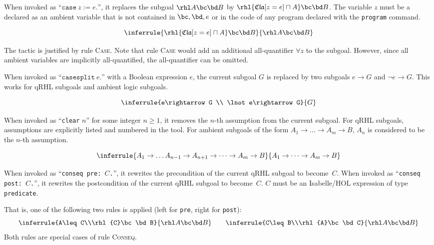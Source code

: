 \documentclass{article}
\renewcommand\ruleref[1]{rule \hbox{\textsc{#1}}}
\begin{document}

When invoked as ``$\mathtt{case}\ z := e\mathtt{.}$'',
it replaces the subgoal $\rhl A\bc\bd B$
by $\rhl{\mathfrak{Cla}[z=e]\sqcap A}\bc\bd B$.
The variable $z$
must be a declared as an ambient variable that is not contained in
$\bc,\bd,e$
or in the code of any program declared with the \texttt{program} command.

\[
\inferrule
{\rhl{\mathfrak{Cla}[z=e]\sqcap A}\bc\bd B}
{\rhl A\bc\bd B}
\]

The tactic is justified by \ruleref{Case}. Note that \ruleref{Case}
would add an additional all-quantifier $\forall z$
to the subgoal. However, since all ambient variables are implicitly
all-quantified, the all-quantifier can be omitted.



When invoked as ``$\mathtt{casesplit}\ e\mathtt{.}$''
with a Boolean expression $e$,
the current subgoal $G$
is replaced by two subgoals $e\rightarrow G$
and $\lnot e\rightarrow G$.
This works for qRHL subgoals and ambient logic subgoals.

\[
  \inferrule
  {e\rightarrow G
    \\
    \lnot e\rightarrow G}
  {G}
\]


When invoked as ``\texttt{clear} $n$''
for some integer $n\geq 1$,
it removes the $n$-th
assumption from the current subgoal. For qRHL subgoals, assumptions
are explicitly listed and numbered in the tool. For ambient subgoals of the form
$A_1\to \dots \to A_m\to B$,
$A_n$ is considered to be the $n$-th assumption.

\[
  \inferrule
  {A_1\to \dots A_{n-1}\to A_{n+1}\to\dots \to A_m\to B}
  {A_1\to \dots \to A_m\to B}
\]




When invoked as ``\texttt{conseq pre: $C$.}'',
it rewrites the precondition of the current qRHL subgoal to become~$C$.
When invoked as ``\texttt{conseq post: $C$.}'',
it rewrites the postcondition of the current qRHL subgoal to become~$C$.
$C$ must be an Isabelle/HOL expression of type \texttt{predicate}.

That is, one of the following two rules is applied (left for
\texttt{pre}, right for \texttt{post}):
\[
  \inferrule{A\leq C\\\rhl{C}\bc\bd B}{\rhl A\bc\bd B}
  \qquad
  \inferrule{C\leq B\\\rhl{A}\bc\bd C}{\rhl A\bc\bd B}
\]
%
Both rules are special cases of \ruleref{Conseq}.
\end{document}
